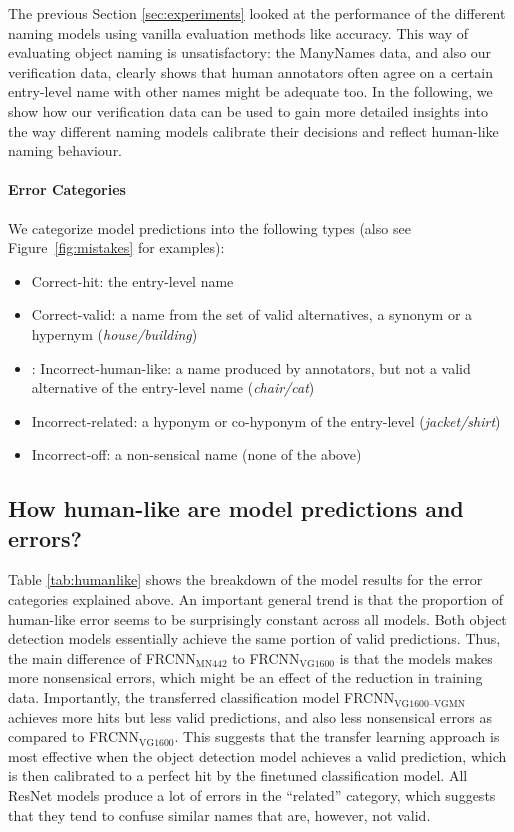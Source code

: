 
The previous Section \ref{sec:experiments} looked at the performance of the different naming models using vanilla evaluation methods like accuracy.
This way of evaluating object naming is unsatisfactory: the ManyNames data, and also our verification data, clearly shows that human annotators often agree on a certain entry-level name with other names might be adequate too.
In the following, we show how our verification data can be used to gain more detailed insights into the way different naming models calibrate their decisions and reflect human-like naming behaviour.

\paragraph{Error Categories} We categorize model predictions into the following types (also see Figure~\ref{fig:mistakes} for examples):

\begin{itemize}
\item Correct-hit: the entry-level name 
\item Correct-valid: a name from the set of valid alternatives, a synonym or a hypernym (\textit{house/building})
\item: Incorrect-human-like: a name produced by annotators, but not a valid alternative of the entry-level name  (\textit{chair/cat})
\item Incorrect-related: a hyponym or co-hyponym of the entry-level (\textit{jacket/shirt})
\item Incorrect-off: a non-sensical name (none of the above)
\end{itemize}


\subsection{How human-like are model predictions and errors?}

Table \ref{tab:humanlike} shows the breakdown of the model results for the error categories explained above. An important general trend is that the proportion of human-like error seems to be surprisingly constant across all models. 
Both object detection models essentially achieve the same portion of valid predictions. Thus, the main difference of FRCNN$_{\text{MN442}}$ to  FRCNN$_{\text{VG1600}}$ is that the models makes more nonsensical errors, which might be an effect of the reduction in training data.
Importantly, the transferred classification model FRCNN$_{\text{VG1600--VGMN}}$ achieves more hits but less valid predictions, and also less nonsensical errors as compared to FRCNN$_{\text{VG1600}}$.
This suggests that the transfer learning approach is most effective when the object detection model achieves a valid prediction, which is then calibrated to a perfect hit by the finetuned classification model.
All ResNet models produce a lot of errors in the ``related'' category, which suggests that they tend to confuse similar names that are, however, not valid. 

